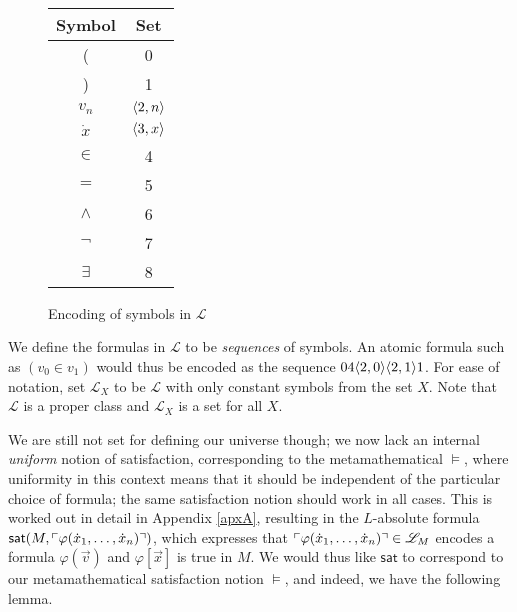\begin{figure}[h]
\label{Figure 1}
\centering
\begin{tabular}{| c | c |}
	\hline
	Symbol & Set\\	\hline
	( & 0\\
	) & 1\\
	$v_n$ & $\langle 2,n\rangle$\\
	$\dot x$ & $\langle 3,x\rangle$\\
	$\in$ & 4\\
	$=$ & 5\\
	$\land$ & 6\\
	$\lnot$ & 7\\
	$\exists$ & 8\\\hline
\end{tabular}
\caption{Encoding of symbols in $\mathscr L$}
\end{figure}

We define the formulas in $\mathscr L$ to be \textit{sequences} of symbols. An atomic formula such as $(v_0\in v_1)$ would thus be encoded as the sequence $04\langle 2,0\rangle\langle 2,1\rangle1$. For ease of notation, set $\mathscr L_X$ to be $\mathscr L$ with only constant symbols from the set $X$. Note that $\mathscr L$ is a proper class and $\mathscr L_X$ is a set for all $X$.


We are still not set for defining our universe though; we now lack an internal \textit{uniform} notion of satisfaction, corresponding to the metamathematical $\models$, where uniformity in this context means that it should be independent of the particular choice of formula; the same satisfaction notion should work in all cases. This is worked out in detail in Appendix \ref{apxA}, resulting in the $L$-absolute formula $\mathsf{sat}(M,\ulcorner \varphi(\dot x_1,\hdots,\dot x_n) \urcorner)$, which expresses that $\ulcorner \varphi(\dot x_1,\hdots,\dot x_n) \urcorner\in\mathscr L_M$ encodes a formula $\varphi(\vec{v})$ and $\varphi[\vec{x}]$ is true in $M$. We would thus like $\mathsf{sat}$ to correspond to our metamathematical satisfaction notion $\models$, and indeed, we have the following lemma.


